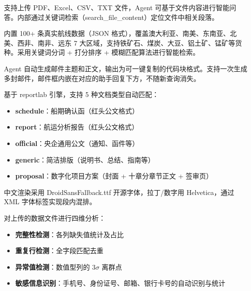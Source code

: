 \documentclass[12pt,a4paper]{ctexart}
\begin{document}
\begin{featurebox}[读取文件内容]
支持上传 PDF、Excel、CSV、TXT 文件，Agent 可基于文件内容进行智能问答。内部通过关键词检索（search\_file\_content）定位文件中相关段落。
\end{featurebox}

\begin{featurebox}[散货船期查询]
内置 100+ 条真实航线数据（JSON 格式），覆盖澳大利亚、南美、东南亚、北美、西非、南非、远东 7 大区域，支持铁矿石、煤炭、大豆、铝土矿、锰矿等货种。采用关键词分词 + 打分排序 + 模糊匹配算法进行智能检索。
\end{featurebox}

\begin{featurebox}[编写邮件]
Agent 自动生成邮件主题和正文，输出为可一键复制的代码块格式。支持一次生成多封邮件，邮件框内嵌在对应的助手回复下方，不随新查询消失。
\end{featurebox}

\begin{featurebox}[生成 PDF 文件]
基于 reportlab 引擎，支持 5 种文档类型自动匹配：
\begin{itemize}[leftmargin=*]
    \item \textbf{schedule}：船期确认函（红头公文格式）
    \item \textbf{report}：航运分析报告（红头公文格式）
    \item \textbf{official}：央企通用公文（通知、函件等）
    \item \textbf{generic}：简洁排版（说明书、总结、指南等）
    \item \textbf{proposal}：数字化项目方案（封面 + 十章分章节正文 + 签审页）
\end{itemize}
中文渲染采用 DroidSansFallback.ttf 开源字体，拉丁/数字用 Helvetica，通过 XML 字体标签实现段内混排。
\end{featurebox}

\begin{featurebox}[数据质量控制]
对上传的数据文件进行四维分析：
\begin{itemize}[leftmargin=*]
    \item \textbf{完整性检测}：各列缺失值统计及占比
    \item \textbf{重复行检测}：全字段匹配去重
    \item \textbf{异常值检测}：数值型列的 3$\sigma$ 离群点
    \item \textbf{敏感信息识别}：手机号、身份证号、邮箱、银行卡号的自动识别与统计
\end{itemize}
\end{featurebox}
\end{document}
